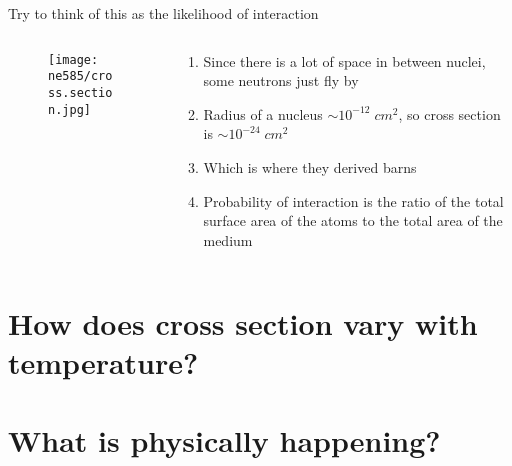 \documentclass[aspectratio=1610,pdftex,dvipsnames,compress,xcolor={dvipsnames}]{beamer}
\begin{document}
\begin{frame}{Try to think of this as the likelihood of interaction}
    \begin{columns}[t]

        \begin{column}{0.40\textwidth}
            \begin{figure}
                \centering
                \texttt{[image: ne585/cross.section.jpg]}
            \end{figure}
        \end{column}

        \begin{column}{0.60\textwidth}
            \begin{enumerate}[series=outerlist,topsep=0pt,itemsep=21pt,leftmargin=*,label=(\arabic*)]
                \item[]Since there is a lot of space in between nuclei, some neutrons just fly by
                \item[]Radius of a nucleus $\sim 10^{-12} \; cm^2$, so cross section is $\sim 10^{-24} \; cm^2$  
                \item[]Which is where they derived barns
                \item[]Probability of interaction is the ratio of the total surface area of the atoms to the total area of the medium
            \end{enumerate}
        \end{column}

    \end{columns}
\end{frame}


\section{How does cross section vary with temperature?}
\section{What is physically happening?}
\end{document}

